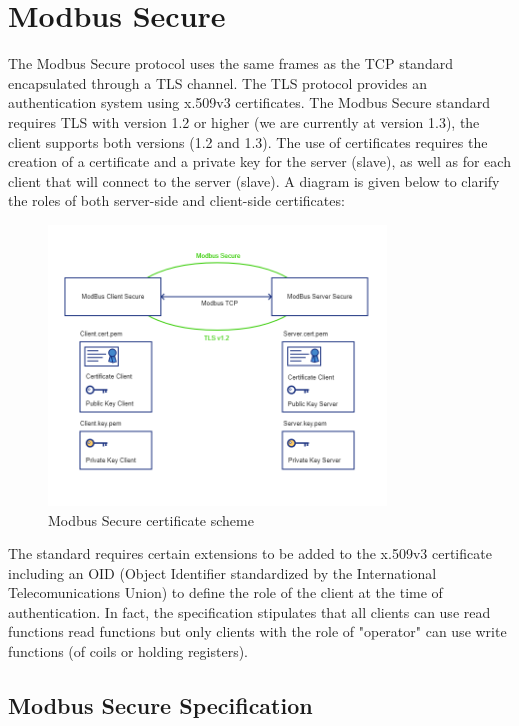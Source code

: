 
\chapter{Modbus Secure}
\label{secure}

The Modbus Secure protocol uses the same frames as the TCP
standard encapsulated through a TLS channel.
The TLS protocol provides an authentication system using x.509v3 certificates. 
The Modbus Secure standard requires
TLS with version 1.2 or higher (we are currently at version 1.3),
the client supports both versions (1.2 and 1.3). 
The use of certificates requires the creation of a certificate and a
private key for the server (slave), as well as for 
each client that will connect to the server (slave). 
A diagram is given below to clarify the
roles of both server-side and client-side certificates:

\begin{figure}[H]
  \centering
  \includegraphics[width=0.8\textwidth]{../Img/schemamodbussecure.png}
  \caption{Modbus Secure certificate scheme}
\end{figure}

The standard requires certain extensions to be added to the x.509v3 certificate including an OID (Object
Identifier standardized by the International Telecomunications Union) to define the role of the client at the
time of authentication. In fact, the specification stipulates that all clients can use read functions
read functions but only clients with the role of "operator" can use write functions (of coils or holding
registers).

\newpage
\section{Modbus Secure Specification}

